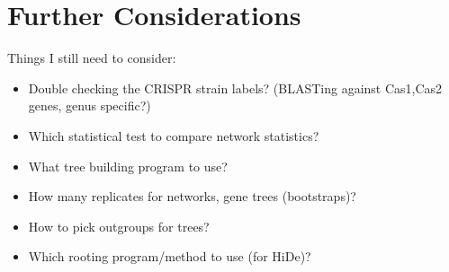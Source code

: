 \documentclass[12pt,letter]{article}
\begin{document}
\section*{Further Considerations}
Things I still need to consider:
    \begin{itemize}
        \item Double checking the CRISPR strain labels? (BLASTing against Cas1,Cas2 genes, genus specific?)
        \item Which statistical test to compare network statistics?
        \item What tree building program to use?
        \item How many replicates for networks, gene trees (bootstraps)?
        \item How to pick outgroups for trees?
        \item Which rooting program/method to use (for HiDe)?
    \end{itemize}
\end{document}
